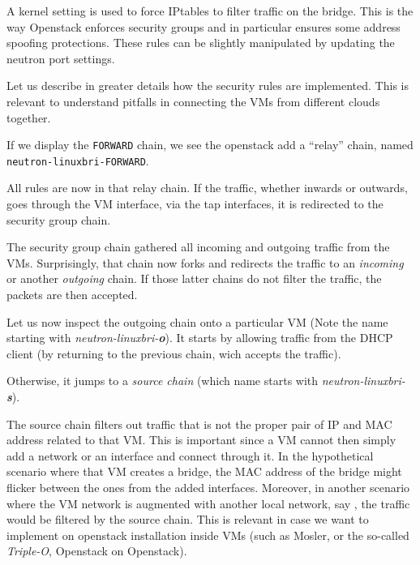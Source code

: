 A kernel setting is used to force IPtables to filter traffic on the
bridge. This is the way Openstack enforces security groups and in
particular ensures some address spoofing protections. These rules can
be slightly manipulated by updating the neutron port settings.



Let us describe in greater details how the security rules are
implemented. This is relevant to understand pitfalls in connecting the
VMs from different clouds together.

If we display the \texttt{FORWARD} chain, we see the openstack add a
``relay'' chain, named \texttt{neutron-linuxbri-FORWARD}.


All rules are now in that relay chain. If the traffic, whether inwards
or outwards, goes through the VM interface, via the tap interfaces, it
is redirected to the security group chain.


The security group chain gathered all incoming and outgoing traffic
from the VMs. Surprisingly, that chain now forks and redirects the
traffic to an \emph{incoming} or another \emph{outgoing} chain. If
those latter chains do not filter the traffic, the packets are then
accepted.


Let us now inspect the outgoing chain onto a particular VM (Note the
name starting with \emph{neutron-linuxbri-\textbf{o}}). It starts by
allowing traffic from the DHCP client (by returning to the previous
chain, wich accepts the traffic).


Otherwise, it jumps to a \emph{source chain} (which name starts with \emph{neutron-linuxbri-\textbf{s}}).


The source chain filters out traffic that is not the proper pair of IP
and MAC address related to that VM. This is important since a VM
cannot then simply add a network or an interface and connect through
it. In the hypothetical scenario where that VM creates a bridge, the
MAC address of the bridge might flicker between the ones from the
added interfaces. Moreover, in another scenario where the VM network
is augmented with another local network, say , the
traffic would be filtered by the source chain. This is relevant in
case we want to implement on openstack installation inside VMs (such
as Mosler, or the so-called \emph{Triple-O}, Openstack on Openstack).

